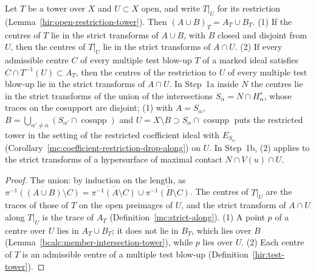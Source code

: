 \begin{lemma}
\label{bcalc:centres-localise}
\mixedleanok
Let \(T\) be a tower over \(X\) and \(U\subset X\) open, and write \(T|_U\) for its restriction (Lemma~\ref{hir:open-restriction-tower}). Then \((A\cup B)_T=A_T\cup B_T\).
(1) If the centres of \(T\) lie in the strict transforms of \(A\cup B\), with \(B\) closed and disjoint from \(U\), then the centres of \(T|_U\) lie in the strict
transforms of \(A\cap U\). (2) If every admissible centre \(C\) of every multiple test blow-up \(T\) of a marked ideal satisfies \(C\cap T^{-1}(U)\subset A_T\), then
the centres of the restriction to \(U\) of every multiple test blow-up lie in the strict transforms of \(A\cap U\).
In Step~1a inside \(N\) the centres lie in the strict transforms of the union of the intersections \(S_\alpha=N\cap H^s_\alpha\), whose traces on the cosupport
are disjoint; (1) with \(A=S_\alpha\), \(B=\bigcup_{\alpha'\ne\alpha}(S_{\alpha'}\cap\operatorname{cosupp})\) and \(U=X\setminus B\supset S_\alpha\cap\operatorname{cosupp}\) puts the
restricted tower in the setting of the restricted coefficient ideal with \(E_{S_\alpha}\) (Corollary~\ref{mc:coefficient-restriction-drop-along}) on \(U\). In Step~1b, (2) applies to the
strict transforms of a hypersurface of maximal contact \(N\cap V(u)\cap U\).
\end{lemma}
\begin{proof}
\mixedleanok
The union: by induction on the length, as \(\overline{\pi^{-1}((A\cup B)\setminus C)}=\overline{\pi^{-1}(A\setminus C)}\cup\overline{\pi^{-1}(B\setminus C)}\).
The centres of \(T|_U\) are the traces of those of \(T\) on the open preimages of \(U\), and the strict transform of \(A\cap U\) along \(T|_U\) is the trace of
\(A_T\) (Definition~\ref{mc:strict-along}). (1) A point \(p\) of a centre over \(U\) lies in \(A_T\cup B_T\); it does not lie in \(B_T\), which lies over \(B\)
(Lemma~\ref{bcalc:member-intersection-tower}), while \(p\) lies over \(U\). (2) Each centre of \(T\) is an admissible centre of a multiple test blow-up
(Definition~\ref{hir:test-tower}).
\end{proof}
